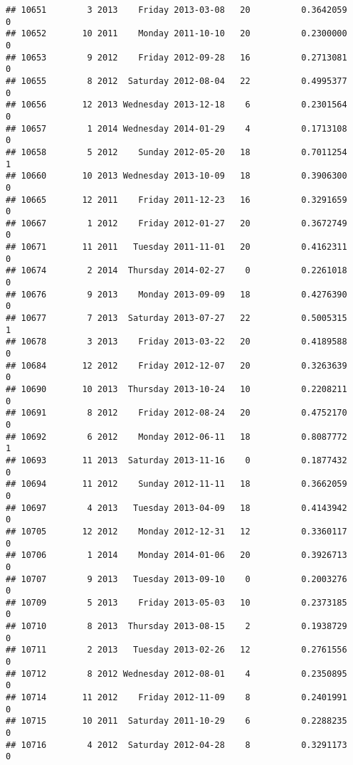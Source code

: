 \documentclass[
]{article}
\begin{document}
\begin{verbatim}
## 10651        3 2013    Friday 2013-03-08   20          0.3642059             0
## 10652       10 2011    Monday 2011-10-10   20          0.2300000             0
## 10653        9 2012    Friday 2012-09-28   16          0.2713081             0
## 10655        8 2012  Saturday 2012-08-04   22          0.4995377             0
## 10656       12 2013 Wednesday 2013-12-18    6          0.2301564             0
## 10657        1 2014 Wednesday 2014-01-29    4          0.1713108             0
## 10658        5 2012    Sunday 2012-05-20   18          0.7011254             1
## 10660       10 2013 Wednesday 2013-10-09   18          0.3906300             0
## 10665       12 2011    Friday 2011-12-23   16          0.3291659             0
## 10667        1 2012    Friday 2012-01-27   20          0.3672749             0
## 10671       11 2011   Tuesday 2011-11-01   20          0.4162311             0
## 10674        2 2014  Thursday 2014-02-27    0          0.2261018             0
## 10676        9 2013    Monday 2013-09-09   18          0.4276390             0
## 10677        7 2013  Saturday 2013-07-27   22          0.5005315             1
## 10678        3 2013    Friday 2013-03-22   20          0.4189588             0
## 10684       12 2012    Friday 2012-12-07   20          0.3263639             0
## 10690       10 2013  Thursday 2013-10-24   10          0.2208211             0
## 10691        8 2012    Friday 2012-08-24   20          0.4752170             0
## 10692        6 2012    Monday 2012-06-11   18          0.8087772             1
## 10693       11 2013  Saturday 2013-11-16    0          0.1877432             0
## 10694       11 2012    Sunday 2012-11-11   18          0.3662059             0
## 10697        4 2013   Tuesday 2013-04-09   18          0.4143942             0
## 10705       12 2012    Monday 2012-12-31   12          0.3360117             0
## 10706        1 2014    Monday 2014-01-06   20          0.3926713             0
## 10707        9 2013   Tuesday 2013-09-10    0          0.2003276             0
## 10709        5 2013    Friday 2013-05-03   10          0.2373185             0
## 10710        8 2013  Thursday 2013-08-15    2          0.1938729             0
## 10711        2 2013   Tuesday 2013-02-26   12          0.2761556             0
## 10712        8 2012 Wednesday 2012-08-01    4          0.2350895             0
## 10714       11 2012    Friday 2012-11-09    8          0.2401991             0
## 10715       10 2011  Saturday 2011-10-29    6          0.2288235             0
## 10716        4 2012  Saturday 2012-04-28    8          0.3291173             0

\end{verbatim}
\end{document}
